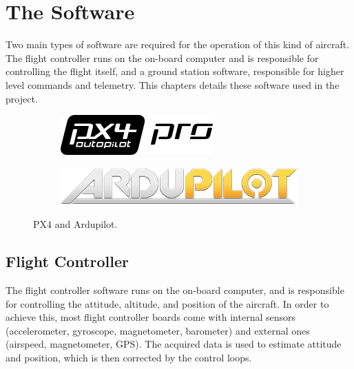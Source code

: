 \chapter{The Software} \label{chap:software}

Two main types of software are required for the operation of this kind of aircraft. The flight controller runs on the on-board computer and is responsible for controlling the flight itself, and a ground station software, responsible for higher level commands and telemetry.
This chapters details these software used in the project.

\begin{figure}[h]
  \centering
  \begin{subfigure}{.5\textwidth}
    \centering
    \includegraphics[width=\linewidth]{figs/px4.png}
  \end{subfigure}%
  \begin{subfigure}{.5\textwidth}
    \centering
    \includegraphics[width=\linewidth]{figs/ardupilot.png}

  \end{subfigure}
  \caption{PX4 and Ardupilot.}
  \label{fig:motorcurves}
\end{figure}


\section{Flight Controller}
The flight controller software runs on the on-board computer, and is responsible for controlling the attitude, altitude, and position of the aircraft.
%
In order to achieve this, most flight controller boards come with internal sensors (accelerometer, gyroscope, magnetometer, barometer) and external ones (airspeed, magnetometer, GPS). 
%
The acquired data is used to estimate attitude and position, which is then corrected by the control loops.

